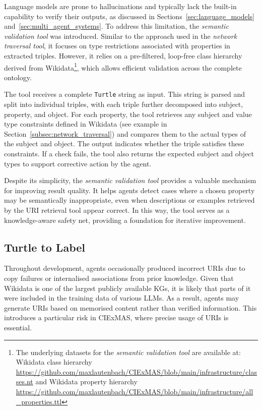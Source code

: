 \documentclass[a4paper,oneside,bibliography=totoc]{scrbook}
\begin{document}
Language models are prone to hallucinations and typically lack the built-in capability to verify their outputs, as discussed in Sections~\ref{sec:language_models} and~\ref{sec:multi_agent_systems}. To address this limitation, the \textit{semantic validation tool} was introduced. Similar to the approach used in the \textit{network traversal tool}, it focuses on type restrictions associated with properties in extracted triples. However, it relies on a pre-filtered, loop-free class hierarchy derived from Wikidata\footnote{The underlying datasets for the \textit{semantic validation tool} are available at: Wikidata class hierarchy \url{https://github.com/maxlautenbach/CIExMAS/blob/main/infrastructure/classes.nt} and Wikidata property hierarchy \url{https://github.com/maxlautenbach/CIExMAS/blob/main/infrastructure/all_properties.ttl}}, which allows efficient validation across the complete ontology.

The tool receives a complete \texttt{Turtle} string as input. This string is parsed and split into individual triples, with each triple further decomposed into subject, property, and object. For each property, the tool retrieves any subject and value type constraints defined in Wikidata (see example in Section~\ref{subsec:network_traversal}) and compares them to the actual types of the subject and object. The output indicates whether the triple satisfies these constraints. If a check fails, the tool also returns the expected subject and object types to support corrective action by the agent.

Despite its simplicity, the \textit{semantic validation tool} provides a valuable mechanism for improving result quality. It helps agents detect cases where a chosen property may be semantically inappropriate, even when descriptions or examples retrieved by the \ac{URI} retrieval tool appear correct. In this way, the tool serves as a knowledge-aware safety net, providing a foundation for iterative improvement.


\subsection{Turtle to Label}
\label{subsec:turtle_to_label}

Throughout development, agents occasionally produced incorrect \acp{URI} due to copy failures or internalised associations from prior knowledge. Given that Wikidata is one of the largest publicly available \acp{KG}, it is likely that parts of it were included in the training data of various \acp{LLM}. As a result, agents may generate \acp{URI} based on memorised content rather than verified information. This introduces a particular risk in CIExMAS, where precise usage of \acp{URI} is essential.
\end{document}
